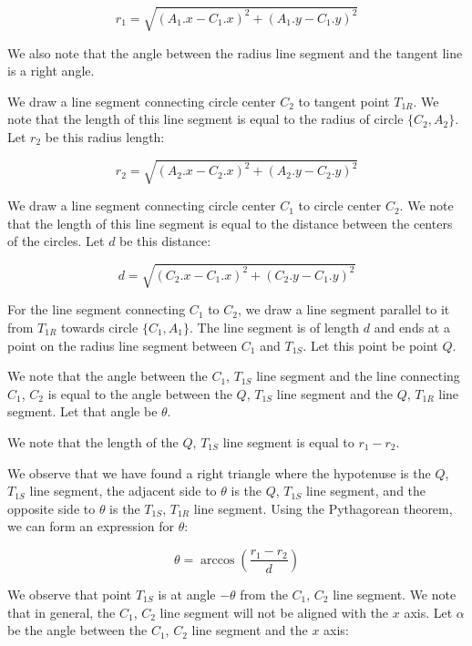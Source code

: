 \documentclass{article}
\begin{document}
\begin{equation}
    \label{eq:r_1}
    r_1 = \sqrt{(A_1.x - C_1.x)^2 + (A_1.y - C_1.y)^2}
\end{equation}

We also note that the angle between the radius line segment and the tangent line is a right angle.

We draw a line segment connecting circle center $C_2$ to tangent point $T_{1R}$. We note that the length of this line segment is equal to the radius of circle $\{C_2, A_2\}$. Let $r_2$ be this radius length:

\begin{equation}
    \label{eq:r_2}
r_2 = \sqrt{(A_2.x - C_2.x)^2 + (A_2.y - C_2.y)^2}
\end{equation}

We draw a line segment connecting circle center $C_1$ to circle center $C_2$. We note that the length of this line segment is equal to the distance between the centers of the circles. Let $d$ be this distance:

\begin{equation}
    \label{eq:d}
    d = \sqrt{(C_2.x - C_1.x)^2 + (C_2.y - C_1.y)^2}
\end{equation}

For the line segment connecting $C_1$ to $C_2$, we draw a line segment parallel to it from $T_{1R}$ towards circle $\{C_1, A_1\}$. The line segment is of length $d$ and ends at a point on the radius line segment between $C_1$ and $T_{1S}$. Let this point be point $Q$.

We note that the angle between the $C_1$, $T_{1S}$ line segment and the line connecting $C_1$, $C_2$ is equal to the angle between the $Q$, $T_{1S}$ line segment and the $Q$, $T_{1R}$ line segment. Let that angle be $\theta$.

We note that the length of the $Q$, $T_{1S}$ line segment is equal to $r_1 - r_2$.

We observe that we have found a right triangle where the hypotenuse is the $Q$, $T_{1S}$ line segment, the adjacent side to $\theta$ is the $Q$, $T_{1S}$ line segment, and the opposite side to $\theta$ is the $T_{1S}$,  $T_{1R}$ line segment. Using the Pythagorean theorem, we can form an expression for $\theta$:

\begin{equation}
    \label{eq:theta}
    \theta = \arccos\left(\frac{r_1 - r_2}{d}\right)
\end{equation}

We observe that point $T_{1S}$ is at angle $-\theta$ from the $C_1$, $C_2$ line segment. We note that in general, the $C_1$, $C_2$ line segment will not be aligned with the $x$ axis. Let $\alpha$ be the angle between the $C_1$, $C_2$ line segment and the $x$ axis:
\end{document}
